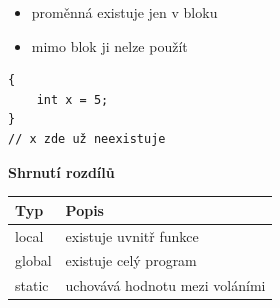\documentclass[a4paper,10pt]{article}
\begin{document}
\begin{vysvetlenibox}
\begin{itemize}
\item proměnná existuje jen v bloku { }
\item mimo blok ji nelze použít
\end{itemize}

\begin{vzorcebox}
\begin{verbatim}
{
    int x = 5;
}
// x zde už neexistuje
\end{verbatim}
\end{vzorcebox}

\textbf{Shrnutí rozdílů}

\begin{tabularx}{\linewidth}{l X}
\toprule
\textbf{Typ} & \textbf{Popis} \\
\midrule
local & existuje uvnitř funkce \\
global & existuje celý program \\
static & uchovává hodnotu mezi voláními \\
\bottomrule
\end{tabularx}

\end{vysvetlenibox}
\end{document}
